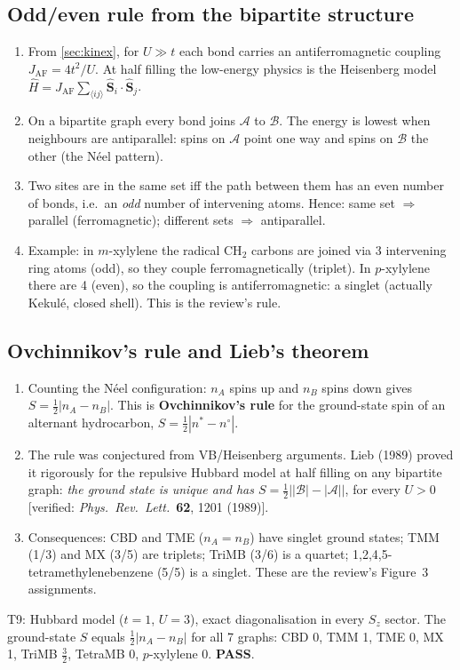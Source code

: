 \subsection{Odd/even rule from the bipartite structure}
\begin{enumerate}
  \item From \cref{sec:kinex}, for $U\gg t$ each bond carries an antiferromagnetic coupling
        $J_{\text{AF}}=4t^2/U$. At half filling the low-energy physics is the Heisenberg model
        $\hat H=J_{\text{AF}}\sum_{\langle ij\rangle}\hat{\mathbf S}_i\cdot\hat{\mathbf S}_j$.
  \item On a bipartite graph every bond joins $\mathcal A$ to $\mathcal B$. The energy is lowest when neighbours
        are antiparallel: spins on $\mathcal A$ point one way and spins on $\mathcal B$ the other (the Néel pattern).
  \item Two sites are in the same set iff the path between them has an even number of bonds, i.e.\ an
        \emph{odd} number of intervening atoms. Hence:
        same set $\Rightarrow$ parallel (ferromagnetic); different sets $\Rightarrow$ antiparallel.
  \item Example: in $m$-xylylene the radical CH$_2$ carbons are joined via 3 intervening ring atoms (odd), so
        they couple ferromagnetically (triplet). In $p$-xylylene there are 4 (even), so the coupling is
        antiferromagnetic: a singlet (actually Kekulé, closed shell). This is the review's rule.
\end{enumerate}

\subsection{Ovchinnikov's rule and Lieb's theorem}
\begin{enumerate}
  \item Counting the Néel configuration: $n_A$ spins up and $n_B$ spins down gives $S=\tfrac12|n_A-n_B|$.
        This is \textbf{Ovchinnikov's rule} for the ground-state spin of an alternant hydrocarbon,
        $S=\tfrac12|n^*-n^\circ|$.
  \item The rule was conjectured from VB/Heisenberg arguments. Lieb (1989) proved it rigorously for the
        repulsive Hubbard model at half filling on any bipartite graph: \emph{the ground state is unique and
        has $S=\tfrac12\bigl||\mathcal B|-|\mathcal A|\bigr|$}, for every $U>0$ [verified: \emph{Phys.\ Rev.\ Lett.}\ \textbf{62}, 1201 (1989)].
  \item Consequences: CBD and TME ($n_A=n_B$) have singlet ground states; TMM (1/3) and MX (3/5) are triplets;
        TriMB (3/6) is a quartet; 1,2,4,5-tetramethylenebenzene (5/5) is a singlet. These are the review's
        Figure~3 assignments.
\end{enumerate}
\begin{verifybox}
T9: Hubbard model ($t=1$, $U=3$), exact diagonalisation in every $S_z$ sector. The ground-state $S$ equals
$\tfrac12|n_A-n_B|$ for all 7 graphs: CBD 0, TMM 1, TME 0, MX 1, TriMB $\tfrac32$, TetraMB 0, $p$-xylylene 0. \textbf{PASS}.
\end{verifybox}

